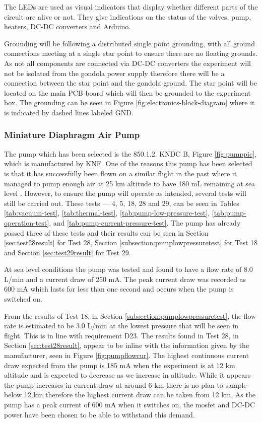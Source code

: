 The LEDs are used as visual indicators that display whether different parts of the circuit are alive or not. They give indications on the status of the valves, pump, heaters, DC-DC converters and Arduino. 

Grounding will be following a distributed single point grounding, with all ground connections meeting at a single star point to ensure there are no floating grounds. As not all components are connected via DC-DC converters the experiment will not be isolated from the gondola power supply therefore there will be a connection between the star point and the gondola ground. The star point will be located on the main PCB board which will then be grounded to the experiment box. The grounding can be seen in Figure \ref{fig:electronics-block-diagram} where it is indicated by dashed lines labeled GND. 

\subsubsection{Miniature Diaphragm Air Pump}
The pump which has been selected is the 850.1.2. KNDC B, Figure \ref{fig:pumppic}, which is manufactured by KNF. One of the reasons this pump has been selected is that it has successfully been flown on a similar flight in the past where it managed to pump enough air at 25 km altitude to have 180 mL remaining at sea level \cite{LISA}. However, to ensure the pump will operate as intended, several tests will still be carried out. These tests --- 4, 5, 18, 28 and 29, can be seen in Tables \ref{tab:vacuum-test}, \ref{tab:thermal-test}, \ref{tab:pump-low-pressure-test}, \ref{tab:pump-operation-test}, and \ref{tab:pump-current-pressure-test}. The pump has already passed three of these tests and their results can be seen in Section \ref{sec:test28result} for Test 28, Section \ref{subsection:pumplowpressuretest} for Test 18 and Section \ref{sec:test29result} for Test 29.

At sea level conditions the pump was tested and found to have a flow rate of 8.0 L/min and a current draw of 250 mA. The peak current draw was recorded as 600 mA which lasts for less than one second and occurs when the pump is switched on. 

From the results of Test 18, in Section \ref{subsection:pumplowpressuretest}, the flow rate is estimated to be 3.0 L/min at the lowest pressure that will be seen in flight. This is in line with requirement D23. The results found in Test 28, in Section \ref{sec:test28result}, appear to be inline with the information given by the manufacturer, seen in Figure \ref{fig:pumpflowcur}.  The highest continuous current draw expected from the pump is 185 mA when the experiment is at 12 km altitude and is expected to decrease as we increase in altitude. While it appears the pump increases in current draw at around 6 km there is no plan to sample below 12 km therefore the highest current draw can be taken from 12 km. As the pump has a peak current of 600 mA when it switches on, the mosfet and DC-DC power have been chosen to be able to withstand this demand. 

